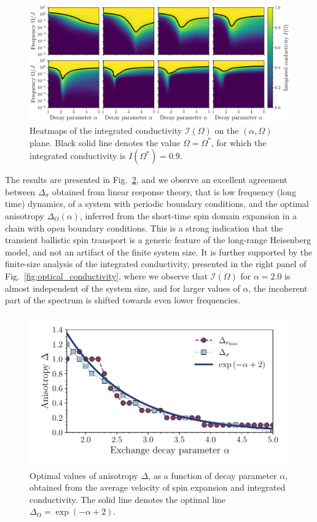 \begin{figure}[htbp]
  \centering
  \includegraphics[width=\linewidth]{Figures/I_cond_heatmap.png}
  \caption{Heatmaps of the integrated conductivity \(\mathcal{I}(\Omega)\) on the \((\alpha ,\Omega)\) plane.
  Black solid line denotes the value \(\Omega = \Omega^{\ast}\), 
  for which the integrated conductivity is \(I(\Omega^{\ast}) = 0.9\).}
  \label{fig:I_cond_heatmap}
\end{figure}

The results are presented in Fig.~\ref{fig:optimal_anisotropy}, and we observe an excellent
agreement between \(\Delta_{\sigma}\) obtained from linear response theory, that is low frequency (long time) dynamics,
of a system with periodic boundary conditions,
and the optimal anisotropy \(\Delta_{O}(\alpha)\), inferred from the short-time spin domain expansion in a chain
with open boundary conditions. This is a strong indication that the transient ballistic spin transport
is a generic feature of the long-range Heisenberg model, and not an artifact of the finite system size.
It is further supported by the finite-size analysis of the integrated conductivity, presented in the right panel
of Fig.~\ref{fig:optical_conductivity}, where we observe that \(\mathcal{I}(\Omega)\) for \(\alpha = 2.0\)
is almost independent of the system size, and for larger values of \(\alpha\), the incoherent part of the spectrum
is shifted towards even lower frequencies.

\begin{figure}[htbp]
  \centering
  \includegraphics[width=0.8\linewidth]{Figures/optimal_anisotropies.pdf}
  \caption{Optimal values of anisotropy \(\Delta\), as a function of decay parameter \(\alpha\), obtained from
  the average velocity of spin expansion and integrated conductivity. The solid line denotes the optimal line
  \(\Delta_{\mathrm{O}} = \exp\left(-\alpha + 2\right)\).}
  \label{fig:optimal_anisotropy}
\end{figure}


